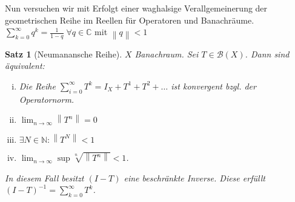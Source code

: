\documentclass[ngerman]{report}
\theoremstyle{plain}%
\newtheorem{thm}{Satz}[chapter]
\theoremstyle{definition}%
\theoremstyle{myStyle}
\newcommand{\C}{\mathbb{C}}
\newcommand{\N}{\mathbb{N}}
\newcommand{\B}{\mathcal{B}} %
\newcommand{\norm}[1]{\left \|#1\right\| }
\newcommand{\limes}[1][\infty]{\lim_{n \to #1}}
\newcommand{\inv}[1]{#1^{-1}}
\newcommand{\disp}{\displaystyle}
\begin{document}
Nun versuchen wir mit Erfolgt einer waghalsige Verallgemeinerung der geometrischen Reihe im Reellen für Operatoren und Banachräume. 
	$\sum_{k=0}^\infty q^k = \frac{1}{1-q} \; \forall q\in\C$ mit $\norm{q} < 1$
	\begin{thm}[Neumanansche Reihe] 
		$X$ Banachraum. Sei $T\in \B(X)$. Dann sind äquivalent: 
			\begin{enumerate}[i)]
				\item Die Reihe $ \sum_{i=0}^\infty T^k = I_X + T^1 + T^2 + \dots$ ist konvergent bzgl. der Operatornorm.
				\item $\disp \limes \norm{T^n} = 0$
				\item $\exists N\in \N: \norm{T^N} < 1$
				\item $\disp \limes \sup \sqrt[n]{\norm{T^n}} < 1$. 
			\end{enumerate}
		In diesem Fall besitzt $(I-T)$ eine beschränkte Inverse.
		Diese erfüllt $\inv{(I-T)} = \sum_{k=0}^\infty T^k$.
	\end{thm}
\end{document}
